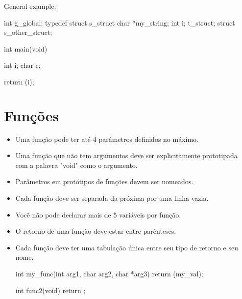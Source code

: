 \documentclass{42-pt}
\begin{document}
            \newpage

            General example:
            \begin{42ccode}
int             g_global;
typedef struct  s_struct
{
    char    *my_string;
    int     i;
}               t_struct;
struct          s_other_struct;

int     main(void)
{
    int     i;
    char    c;

    return (i);
}
            \end{42ccode}
            \newpage

    \section{Funções}

        \begin{itemize}

            \item Uma função pode ter até 4 parâmetros definidos no máximo.

            \item Uma função que não tem argumentos deve ser
                explicitamente prototipada com a palavra "void" como o
                argumento.

            \item Parâmetros em protótipos de funções devem ser nomeados.

            \item Cada função deve ser separada da próxima por
                uma linha vazia.

            \item Você não pode declarar mais de 5 variáveis por função.

            \item O retorno de uma função deve estar entre parênteses. 

            \item Cada função deve ter uma tabulação única entre seu
                tipo de retorno e seu nome.

            \begin{42ccode}
int my_func(int arg1, char arg2, char *arg3)
{
    return (my_val);
}

int func2(void)
{
    return ;
}
            \end{42ccode}

        \end{itemize}
        \newpage
\end{document}
